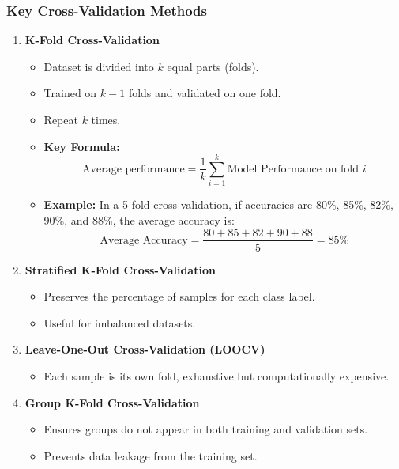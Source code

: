 \documentclass[aspectratio=169]{beamer}
\begin{document}
\begin{frame}[fragile]
    \frametitle{Key Cross-Validation Methods}
    \begin{enumerate}
        \item \textbf{K-Fold Cross-Validation}
        \begin{itemize}
            \item Dataset is divided into \(k\) equal parts (folds).
            \item Trained on \(k-1\) folds and validated on one fold.
            \item Repeat \(k\) times.
            \item \textbf{Key Formula:}
                \begin{equation}
                    \text{Average performance} = \frac{1}{k} \sum_{i=1}^{k} \text{Model Performance on fold } i
                \end{equation}
            \item \textbf{Example:} In a 5-fold cross-validation, if accuracies are 80\%, 85\%, 82\%, 90\%, and 88\%, the average accuracy is:
                \begin{equation}
                    \text{Average Accuracy} = \frac{80 + 85 + 82 + 90 + 88}{5} = 85\%
                \end{equation}
        \end{itemize}
        
        \item \textbf{Stratified K-Fold Cross-Validation}
        \begin{itemize}
            \item Preserves the percentage of samples for each class label.
            \item Useful for imbalanced datasets.
        \end{itemize}
        
        \item \textbf{Leave-One-Out Cross-Validation (LOOCV)}
        \begin{itemize}
            \item Each sample is its own fold, exhaustive but computationally expensive.
        \end{itemize}

        \item \textbf{Group K-Fold Cross-Validation}
        \begin{itemize}
            \item Ensures groups do not appear in both training and validation sets.
            \item Prevents data leakage from the training set.
        \end{itemize}
    \end{enumerate}
\end{frame}
\end{document}
